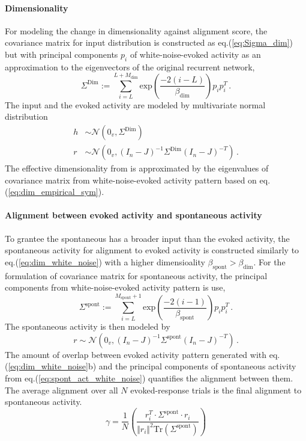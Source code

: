 \documentclass[11pt]{article}
\begin{document}
{	%
	\paragraph{Dimensionality} For modeling the change in dimensionality against alignment score, the covariance matrix for input distribution is constructed as eq.(\ref{eq:Sigma_dim}) but with principal components $p_i$ of white-noise-evoked activity as an approximation to the eigenvectors of the original recurrent network, 
		\begin{equation} \label{eq:dim_white_noise}
			\Sigma^{\text{Dim}} := \sum_{i=L}^{L+M_{\text{dim}}} \text{exp}\left(\frac{-2(i-L)}{\beta_{\text{dim}}}\right) p_i p_i^T \, .
		\end{equation}
	The input and the evoked activity are modeled by multivariate normal distribution 
		\begin{subequations} 
			\begin{align}
				h & \sim \mathcal{N}(0_v, \Sigma^{\text{Dim}}) \\
				r & \sim \mathcal{N}(0_v, (I_n - J)^{-1} \Sigma^{\text{Dim}} (I_n - J)^{-T}) \,.
			\end{align}
		\end{subequations}
	The effective dimensionality from is approximated by the eigenvalues of covariance matrix from white-noise-evoked activity pattern based on eq.(\ref{eq:dim_empirical_sym}). 
	
	\paragraph{Alignment between evoked activity and spontaneous activity}  To grantee the spontaneous has a broader input than the evoked activity, the spontaneous activity for alignment to evoked activity is constructed similarly to eq.(\ref{eq:dim_white_noise}) with a higher dimensioality $\beta_{\text{spont}} > \beta_{\text{dim}}$. For the formulation of covariance matrix for spontaneous activity, the principal components from white-noise-evoked activity pattern is use, 
		\begin{equation}
			\Sigma^{\text{spont}} := \sum_{i=L}^{M_{\text{spont}}+1} \text{exp}\left(\frac{-2(i-1)}{\beta_{\text{spont}}}\right) p_i p_i^T \, .
		\end{equation}
	The spontaneous activity is then modeled by
		\begin{equation} \label{eq:spont_act_white_noise}
			r \sim \mathcal{N}(0_v, (I_n - J)^{-1} \Sigma^{\text{spont}} (I_n - J)^{-T}) \,. 
		\end{equation}
	The amount of overlap between evoked activity pattern generated with eq.(\ref{eq:dim_white_noise}b) and the principal components of spontaneous activity from eq.(\ref{eq:spont_act_white_noise}) quantifies the alignment between them. The average alignment over all $N$ evoked-response trials is the final alignment to spontaneous activity.
		\begin{equation}
			\gamma = \frac{1}{N} \left(\frac{r^T_{i} \cdot \Sigma^{\text{spont}} \cdot r_{i}}{\Vert r_{i} \Vert^2 \text{Tr}(\Sigma^{\text{spont}} )}\right)
		\end{equation}
	
}
\end{document}
